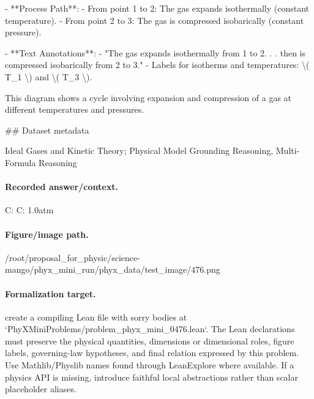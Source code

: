 - **Process Path**:
  - From point 1 to 2: The gas expands isothermally (constant temperature).
  - From point 2 to 3: The gas is compressed isobarically (constant pressure).

- **Text Annotations**:
  - "The gas expands isothermally from 1 to 2. . . then is compressed isobarically from 2 to 3."
  - Labels for isotherms and temperatures: \textbackslash{}( T\_1 \textbackslash{}) and \textbackslash{}( T\_3 \textbackslash{}).
  
This diagram shows a cycle involving expansion and compression of a gas at different temperatures and pressures.

\#\# Dataset metadata

Ideal Gases and Kinetic Theory; Physical Model Grounding Reasoning, Multi-Formula Reasoning

\paragraph{Recorded answer/context.}
C: C: 1.0atm

\paragraph{Figure/image path.}
/root/proposal\_for\_physic/science-mango/phyx\_mini\_run/phyx\_data/test\_image/476.png

\paragraph{Formalization target.}
create a compiling Lean file with sorry bodies at `PhyXMiniProblems/problem\_phyx\_mini\_0476.lean`. The Lean declarations must preserve the physical quantities, dimensions or dimensional roles, figure labels, governing-law hypotheses, and final relation expressed by this problem.
Use Mathlib/Physlib names found through LeanExplore where available. If a physics API is missing, introduce faithful local abstractions rather than scalar placeholder aliases.

